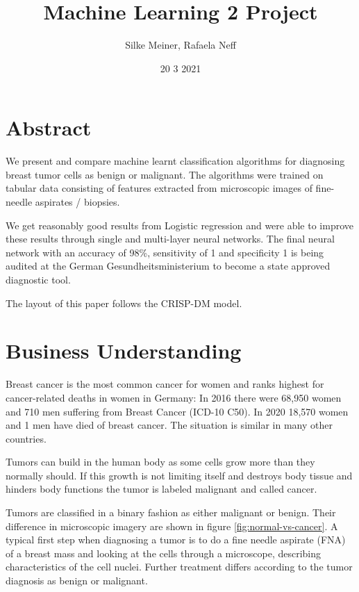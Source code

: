 \documentclass[]{article}
\title{Machine Learning 2 Project}
\author{Silke Meiner, Rafaela Neff}
\date{20 3 2021}
\begin{document}
\maketitle

{
\setcounter{tocdepth}{2}
\tableofcontents
}
\section{Abstract}\label{abstract}

We present and compare machine learnt classification algorithms for
diagnosing breast tumor cells as benign or malignant. The algorithms
were trained on tabular data consisting of features extracted from
microscopic images of fine-needle aspirates / biopsies.

We get reasonably good results from Logistic regression and were able to
improve these results through single and multi-layer neural networks.
The final neural network with an accuracy of 98\%, sensitivity of 1 and
specificity 1 is being audited at the German Gesundheitsministerium to
become a state approved diagnostic tool.

The layout of this paper follows the CRISP-DM model.

\section{Business Understanding}\label{business-understanding}

Breast cancer is the most common cancer for women and ranks highest for
cancer-related deaths in women in Germany: In 2016 there were 68,950
women and 710 men suffering from Breast Cancer (ICD-10 C50). In 2020
18,570 women and 1 men have died of breast cancer. The situation is
similar in many other countries.

Tumors can build in the human body as some cells grow more than they
normally should. If this growth is not limiting itself and destroys body
tissue and hinders body functions the tumor is labeled malignant and
called cancer.

Tumors are classified in a binary fashion as either malignant or benign.
Their difference in microscopic imagery are shown in figure
\ref{fig:normal-vs-cancer}. A typical first step when diagnosing a tumor
is to do a fine needle aspirate (FNA) of a breast mass and looking at
the cells through a microscope, describing characteristics of the cell
nuclei. Further treatment differs according to the tumor diagnosis as
benign or malignant.
\end{document}
